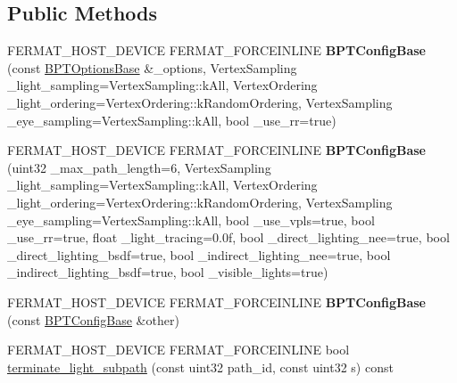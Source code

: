 \subsection*{Public Methods}
\begin{DoxyCompactItemize}
\item 
\mbox{\label{struct_b_p_t_config_base_a6da0cfdd37861bf94d41537ab1337180}} 
F\+E\+R\+M\+A\+T\+\_\+\+H\+O\+S\+T\+\_\+\+D\+E\+V\+I\+CE F\+E\+R\+M\+A\+T\+\_\+\+F\+O\+R\+C\+E\+I\+N\+L\+I\+NE {\bfseries B\+P\+T\+Config\+Base} (const \hyperlink{struct_b_p_t_options_base}{B\+P\+T\+Options\+Base} \&\+\_\+options, Vertex\+Sampling \+\_\+light\+\_\+sampling=Vertex\+Sampling\+::k\+All, Vertex\+Ordering \+\_\+light\+\_\+ordering=Vertex\+Ordering\+::k\+Random\+Ordering, Vertex\+Sampling \+\_\+eye\+\_\+sampling=Vertex\+Sampling\+::k\+All, bool \+\_\+use\+\_\+rr=true)
\item 
\mbox{\label{struct_b_p_t_config_base_a78f72ec36314c94dffba798bac520e11}} 
F\+E\+R\+M\+A\+T\+\_\+\+H\+O\+S\+T\+\_\+\+D\+E\+V\+I\+CE F\+E\+R\+M\+A\+T\+\_\+\+F\+O\+R\+C\+E\+I\+N\+L\+I\+NE {\bfseries B\+P\+T\+Config\+Base} (uint32 \+\_\+max\+\_\+path\+\_\+length=6, Vertex\+Sampling \+\_\+light\+\_\+sampling=Vertex\+Sampling\+::k\+All, Vertex\+Ordering \+\_\+light\+\_\+ordering=Vertex\+Ordering\+::k\+Random\+Ordering, Vertex\+Sampling \+\_\+eye\+\_\+sampling=Vertex\+Sampling\+::k\+All, bool \+\_\+use\+\_\+vpls=true, bool \+\_\+use\+\_\+rr=true, float \+\_\+light\+\_\+tracing=0.\+0f, bool \+\_\+direct\+\_\+lighting\+\_\+nee=true, bool \+\_\+direct\+\_\+lighting\+\_\+bsdf=true, bool \+\_\+indirect\+\_\+lighting\+\_\+nee=true, bool \+\_\+indirect\+\_\+lighting\+\_\+bsdf=true, bool \+\_\+visible\+\_\+lights=true)
\item 
\mbox{\label{struct_b_p_t_config_base_a594b18c9ff1e7f63158d0821ddac776e}} 
F\+E\+R\+M\+A\+T\+\_\+\+H\+O\+S\+T\+\_\+\+D\+E\+V\+I\+CE F\+E\+R\+M\+A\+T\+\_\+\+F\+O\+R\+C\+E\+I\+N\+L\+I\+NE {\bfseries B\+P\+T\+Config\+Base} (const \hyperlink{struct_b_p_t_config_base}{B\+P\+T\+Config\+Base} \&other)
\item 
F\+E\+R\+M\+A\+T\+\_\+\+H\+O\+S\+T\+\_\+\+D\+E\+V\+I\+CE F\+E\+R\+M\+A\+T\+\_\+\+F\+O\+R\+C\+E\+I\+N\+L\+I\+NE bool \hyperlink{struct_b_p_t_config_base_a97c865fc0c241b22bece418e7a8574b4}{terminate\+\_\+light\+\_\+subpath} (const uint32 path\+\_\+id, const uint32 s) const

\end{DoxyCompactItemize}
